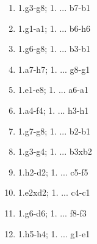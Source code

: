 \begin{enumerate}
\setcounter{enumi}{\value{d_counter}}
\item 1.\rook{}g3-g8\mate{}; 1. ... \rook{}b7-b1\mate{}
\item 1.\rook{}g1-a1\mate{}; 1. ... \rook{}b6-h6\mate{}
\item 1.\rook{}g6-g8\mate{}; 1. ... \rook{}b3-b1\mate{}
\item 1.\rook{}a7-h7\mate{}; 1. ... \rook{}g8-g1\mate{}
\item 1.\rook{}e1-e8\mate{}; 1. ... \rook{}a6-a1\mate{}
\item 1.\rook{}a4-f4\mate{}; 1. ... \rook{}h3-h1\mate{}

\item 1.\rook{}g7-g8\mate{}; 1. ... \rook{}b2-b1\mate{}
\item 1.\rook{}g3-g4\mate{}; 1. ... \rook{}b3xb2\mate{}
\item 1.\rook{}h2-d2\mate{}; 1. ... \rook{}c5-f5\mate{}
\item 1.\rook{}e2xd2\mate{}; 1. ... \rook{}c4-c1\mate{}
\item 1.\rook{}g6-d6\mate{}; 1. ... \rook{}f8-f3\mate{}
\item 1.\rook{}h5-h4\mate{}; 1. ... \rook{}g1-e1\mate{}
\setcounter{d_counter}{\value{enumi}}
\end{enumerate}